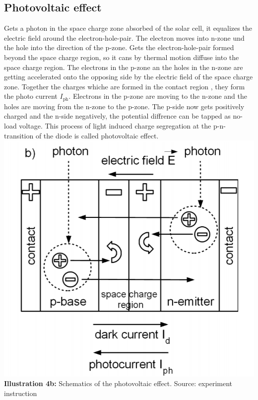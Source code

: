 \documentclass[a4paper, 12pt]{scrartcl}
\begin{document}
\subsection{Photovoltaic effect} 
Gets a photon in the space charge zone absorbed of the solar cell, it equalizes the electric field around the electron-hole-pair. The electron moves into n-zone und the hole into the direction of the p-zone. Gets the electron-hole-pair formed beyond the space charge region, so it cans by thermal motion diffuse into the space charge region. The electrons in the p-zone an the holes in the n-zone are getting accelerated onto the opposing side by the electric field of the space charge zone. Together the charges whiche are formed in the contact region , they form the photo current $I_\textrm{ph}$. Electrons in the p-zone are moving to the n-zone and the holes are moving from the n-zone to the p-zone. The p-side now gets positively charged and the n-side negatively, the potential diffrence can be tapped as no-load voltage. This process of light induced charge segregation at the p-n-transition of the diode is called photovoltaic effect.
\newline
\hspace*{+4cm} 
\includegraphics[scale=0.6]{szpic4b}
\newline
\textbf{Illustration 4b:} Schematics of the photovoltaic effect. Source: experiment instruction 
\newline 
\newline 
\end{document}
